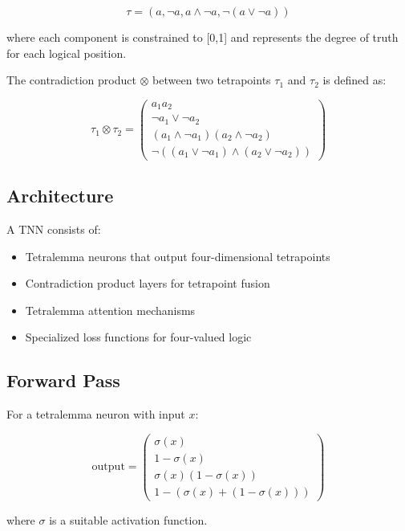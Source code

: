 \documentclass[10pt,journal,compsoc]{IEEEtran}
\begin{document}
\begin{equation}
\tau = (a, \neg a, a \wedge \neg a, \neg(a \vee \neg a))
\end{equation}

where each component is constrained to [0,1] and represents the degree of truth for each logical position.

The contradiction product $\otimes$ between two tetrapoints $\tau_1$ and $\tau_2$ is defined as:

\begin{equation}
\tau_1 \otimes \tau_2 = \begin{pmatrix}
a_1a_2 \\
\neg a_1 \vee \neg a_2 \\
(a_1 \wedge \neg a_1)(a_2 \wedge \neg a_2) \\
\neg((a_1 \vee \neg a_1) \wedge (a_2 \vee \neg a_2))
\end{pmatrix}
\end{equation}

\subsection{Architecture}
A TNN consists of:

\begin{itemize}
\item Tetralemma neurons that output four-dimensional tetrapoints
\item Contradiction product layers for tetrapoint fusion
\item Tetralemma attention mechanisms
\item Specialized loss functions for four-valued logic
\end{itemize}

\subsection{Forward Pass}
For a tetralemma neuron with input $x$:

\begin{equation}
\text{output} = \begin{pmatrix}
\sigma(x) \\
1 - \sigma(x) \\
\sigma(x)(1-\sigma(x)) \\
1 - (\sigma(x) + (1-\sigma(x)))
\end{pmatrix}
\end{equation}

where $\sigma$ is a suitable activation function.
\end{document}

